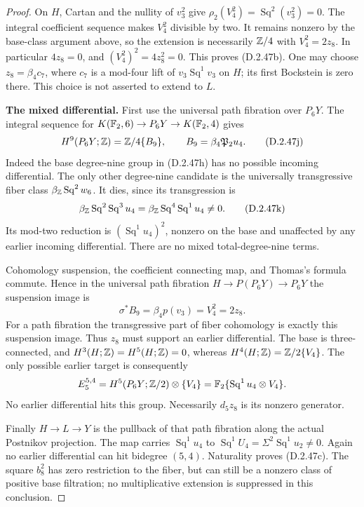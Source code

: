 \begin{proof}
On $H$, Cartan and the nullity of $v_3^2$ give
$\rho_2(V_4^2)=\operatorname{Sq}^2(v_3^2)=0$.
The integral coefficient sequence makes $V_4^2$ divisible
by two. It remains nonzero by the base-class argument above,
so the extension is necessarily $\mathbb Z/4$ with $V_4^2=2z_8$.
In particular $4z_8=0$, and
$(V_4^2)^2=4z_8^2=0$. This proves \textup{(D.2.47b)}.
One may choose $z_8=\beta_4c_7$, where $c_7$ is a mod-four
lift of $v_3\operatorname{Sq}^1v_3$ on $H$; its first
Bockstein is zero there. This choice is not asserted to
extend to $L$.

\medskip\noindent
\textbf{The mixed differential.}
First use the universal path fibration over $P_6Y$.
The integral sequence for
$K(\mathbb F_2,6)\to P_6Y\to K(\mathbb F_2,4)$ gives
\[
 H^9(P_6Y;\mathbb Z)=\mathbb Z/4\{B_9\},
 \qquad B_9=\beta_4\mathfrak P_2u_4.
 \tag{D.2.47j}
\]
Indeed the base degree-nine group in \textup{(D.2.47h)}
has no possible incoming differential. The only other
degree-nine candidate is the universally transgressive fiber
class $\beta_{\mathbb Z}\operatorname{Sq}^2w_6$. It dies, since
its transgression is
\[
 \beta_{\mathbb Z}\operatorname{Sq}^2\operatorname{Sq}^3u_4
   =\beta_{\mathbb Z}\operatorname{Sq}^4\operatorname{Sq}^1u_4\ne0.
 \tag{D.2.47k}
\]
Its mod-two reduction is $(\operatorname{Sq}^1u_4)^2$,
nonzero on the base and unaffected by any earlier incoming
differential. There are no mixed total-degree-nine terms.

Cohomology suspension, the coefficient connecting map, and
Thomas's formula commute. Hence in the universal path fibration
$H\to P(P_6Y)\to P_6Y$ the suspension image is
\[
 \sigma^*B_9=\beta_4p(v_3)=V_4^2=2z_8.
 \tag{D.2.47l}
\]
For a path fibration the transgressive part of fiber cohomology
is exactly this suspension image. Thus $z_8$ must support an
earlier differential. The base is three-connected, and
$H^3(H;\mathbb Z)=H^5(H;\mathbb Z)=0$, whereas
$H^4(H;\mathbb Z)=\mathbb Z/2\{V_4\}$. The only possible earlier
target is consequently
\[
 E_5^{5,4}=H^5(P_6Y;\mathbb Z/2)\otimes\{V_4\}
          =\mathbb F_2\{\operatorname{Sq}^1u_4\otimes V_4\}.
\]
No earlier differential hits this group. Necessarily $d_5z_8$
is its nonzero generator.

Finally $H\to L\to Y$ is the pullback of that path fibration
along the actual Postnikov projection. The map carries
$\operatorname{Sq}^1u_4$ to
$\operatorname{Sq}^1U_4=\Sigma^2\operatorname{Sq}^1u_2\ne0$.
Again no earlier differential can hit bidegree $(5,4)$.
Naturality proves \textup{(D.2.47c)}. The square $b_8^2$
has zero restriction to the fiber, but can still be a
nonzero class of positive base filtration; no multiplicative
extension is suppressed in this conclusion.
\end{proof}
